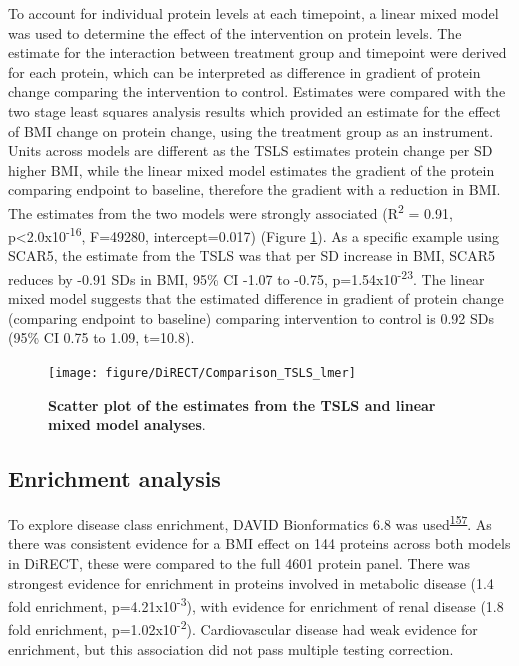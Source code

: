 \documentclass[11pt,twoside]{bristolthesis}
\begin{document}
To account for individual protein levels at each timepoint, a linear mixed model was used to determine the effect of the intervention on protein levels. The estimate for the interaction between treatment group and timepoint were derived for each protein, which can be interpreted as difference in gradient of protein change comparing the intervention to control. Estimates were compared with the two stage least squares analysis results which provided an estimate for the effect of BMI change on protein change, using the treatment group as an instrument. Units across models are different as the TSLS estimates protein change per SD higher BMI, while the linear mixed model estimates the gradient of the protein comparing endpoint to baseline, therefore the gradient with a reduction in BMI. The estimates from the two models were strongly associated (R\textsuperscript{2} = 0.91, p\textless2.0x10\textsuperscript{-16}, F=49280, intercept=0.017) (Figure \ref{fig:tsls-lmer}). As a specific example using SCAR5, the estimate from the TSLS was that per SD increase in BMI, SCAR5 reduces by -0.91 SDs in BMI, 95\% CI -1.07 to -0.75, p=1.54x10\textsuperscript{-23}. The linear mixed model suggests that the estimated difference in gradient of protein change (comparing endpoint to baseline) comparing intervention to control is 0.92 SDs (95\% CI 0.75 to 1.09, t=10.8).



\begin{figure}
\texttt{[image: figure/DiRECT/Comparison\_TSLS\_lmer]} \caption[Scatter plot of the estimates from the TSLS and linear mixed model analyses]{\textbf{Scatter plot of the estimates from the TSLS and linear mixed model analyses}.}\label{fig:tsls-lmer}
\end{figure}
\hypertarget{enrichment-analysis-1}{%
\subsection{Enrichment analysis}\label{enrichment-analysis-1}}

To explore disease class enrichment, DAVID Bionformatics 6.8 was used\textsuperscript{\protect\hyperlink{ref-Huang2009}{157}}. As there was consistent evidence for a BMI effect on 144 proteins across both models in DiRECT, these were compared to the full 4601 protein panel. There was strongest evidence for enrichment in proteins involved in metabolic disease (1.4 fold enrichment, p=4.21x10\textsuperscript{-3}), with evidence for enrichment of renal disease (1.8 fold enrichment, p=1.02x10\textsuperscript{-2}). Cardiovascular disease had weak evidence for enrichment, but this association did not pass multiple testing correction.
\end{document}
